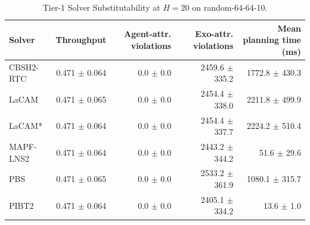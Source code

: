 %
\begin{table}[t]
\centering
\small
\begin{tabular}{lrrrr}
\toprule
Solver & Throughput & Agent-attr. violations & Exo-attr. violations & Mean planning time (ms) \\
\midrule
CBSH2-RTC & 0.471 $\pm$ 0.064 & 0.0 $\pm$ 0.0 & 2459.6 $\pm$ 335.2 & 1772.8 $\pm$ 430.3 \\
LaCAM & 0.471 $\pm$ 0.065 & 0.0 $\pm$ 0.0 & 2454.4 $\pm$ 338.0 & 2211.8 $\pm$ 499.9 \\
LaCAM* & 0.471 $\pm$ 0.064 & 0.0 $\pm$ 0.0 & 2454.4 $\pm$ 337.7 & 2224.2 $\pm$ 510.4 \\
MAPF-LNS2 & 0.471 $\pm$ 0.064 & 0.0 $\pm$ 0.0 & 2443.2 $\pm$ 344.2 & 51.6 $\pm$ 29.6 \\
PBS & 0.471 $\pm$ 0.065 & 0.0 $\pm$ 0.0 & 2533.2 $\pm$ 361.9 & 1080.1 $\pm$ 315.7 \\
PIBT2 & 0.471 $\pm$ 0.064 & 0.0 $\pm$ 0.0 & 2405.1 $\pm$ 334.2 & 13.6 $\pm$ 1.0 \\
\bottomrule
\end{tabular}
\caption{Tier-1 Solver Substitutability at $H = 20$ on random-64-64-10.}
\label{tab:solver_subst_random-64-64-10}
\end{table}

